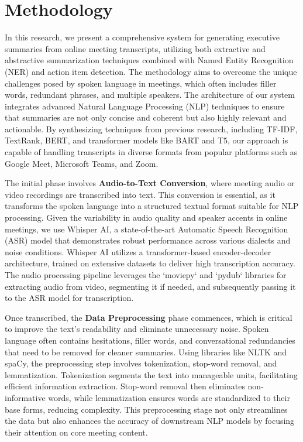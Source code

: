 \documentclass{article}
\begin{document}
\section{Methodology}

In this research, we present a comprehensive system for generating executive summaries from online meeting transcripts, utilizing both extractive and abstractive summarization techniques combined with Named Entity Recognition (NER) and action item detection. The methodology aims to overcome the unique challenges posed by spoken language in meetings, which often includes filler words, redundant phrases, and multiple speakers. The architecture of our system integrates advanced Natural Language Processing (NLP) techniques to ensure that summaries are not only concise and coherent but also highly relevant and actionable. By synthesizing techniques from previous research, including TF-IDF, TextRank, BERT, and transformer models like BART and T5, our approach is capable of handling transcripts in diverse formats from popular platforms such as Google Meet, Microsoft Teams, and Zoom.

The initial phase involves \textbf{Audio-to-Text Conversion}, where meeting audio or video recordings are transcribed into text. This conversion is essential, as it transforms the spoken language into a structured textual format suitable for NLP processing. Given the variability in audio quality and speaker accents in online meetings, we use Whisper AI, a state-of-the-art Automatic Speech Recognition (ASR) model that demonstrates robust performance across various dialects and noise conditions. Whisper AI utilizes a transformer-based encoder-decoder architecture, trained on extensive datasets to deliver high transcription accuracy. The audio processing pipeline leverages the `moviepy` and `pydub` libraries for extracting audio from video, segmenting it if needed, and subsequently passing it to the ASR model for transcription.

Once transcribed, the \textbf{Data Preprocessing} phase commences, which is critical to improve the text’s readability and eliminate unnecessary noise. Spoken language often contains hesitations, filler words, and conversational redundancies that need to be removed for cleaner summaries. Using libraries like NLTK and spaCy, the preprocessing step involves tokenization, stop-word removal, and lemmatization. Tokenization segments the text into manageable units, facilitating efficient information extraction. Stop-word removal then eliminates non-informative words, while lemmatization ensures words are standardized to their base forms, reducing complexity. This preprocessing stage not only streamlines the data but also enhances the accuracy of downstream NLP models by focusing their attention on core meeting content.
\end{document}
